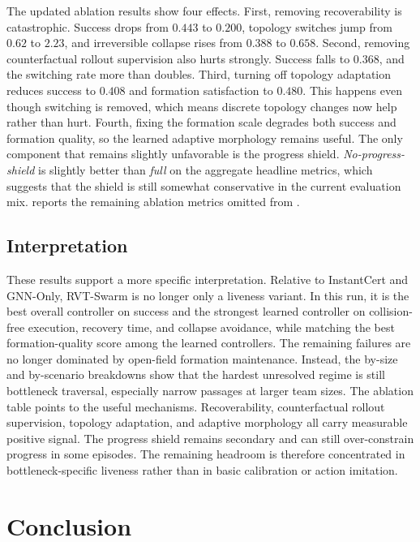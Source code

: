 \documentclass{ieeeaccess}
\begin{document}
The updated ablation results show four effects. First, removing
recoverability is catastrophic. Success drops from $0.443$ to $0.200$,
topology switches jump from $0.62$ to $2.23$, and irreversible
collapse rises from $0.388$ to $0.658$. Second, removing
counterfactual rollout supervision also hurts strongly. Success falls
to $0.368$, and the switching rate more than doubles. Third, turning
off topology adaptation reduces success to $0.408$ and formation
satisfaction to $0.480$. This happens even though switching is removed,
which means discrete topology changes now help rather than hurt.
Fourth, fixing the formation scale degrades both success and formation
quality, so the learned adaptive morphology remains useful. The only
component that remains slightly unfavorable is the progress shield.
\emph{No-progress-shield} is slightly better than \emph{full} on the
aggregate headline metrics, which suggests that the shield is still
somewhat conservative in the current evaluation mix.
 reports the remaining ablation
metrics omitted from .

\subsection{Interpretation}
These results support a more specific interpretation. Relative to
InstantCert and GNN-Only, RVT-Swarm is no longer only a liveness
variant. In this run, it is the best overall controller on success and
the strongest learned controller on collision-free execution, recovery
time, and collapse avoidance, while matching the best formation-quality
score among the learned controllers. The remaining failures are no
longer dominated by open-field formation maintenance. Instead, the
by-size and by-scenario breakdowns show that the hardest unresolved
regime is still bottleneck traversal, especially narrow passages at
larger team sizes. The ablation table points to the useful mechanisms.
Recoverability, counterfactual rollout supervision, topology
adaptation, and adaptive morphology all carry measurable positive
signal. The progress shield remains secondary and can still
over-constrain progress in some episodes. The remaining headroom is
therefore concentrated in bottleneck-specific liveness rather than in
basic calibration or action imitation.

\section{Conclusion}
\label{sec:conclusion}
\end{document}
